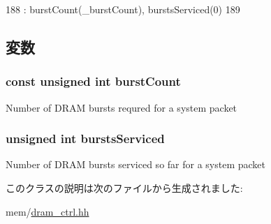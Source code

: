 \begin{DoxyCode}
188             : burstCount(_burstCount), burstsServiced(0)
189             { }
\end{DoxyCode}


\subsection{変数}
\hypertarget{classDRAMCtrl_1_1BurstHelper_af18956b23801b2515632faae1975c9d4}{
\subsubsection[{burstCount}]{\setlength{\rightskip}{0pt plus 5cm}const unsigned int {\bf burstCount}}}
\label{classDRAMCtrl_1_1BurstHelper_af18956b23801b2515632faae1975c9d4}
Number of DRAM bursts requred for a system packet \hypertarget{classDRAMCtrl_1_1BurstHelper_ad168c5fe8d0f76ba798feb77107a06a1}{
\subsubsection[{burstsServiced}]{\setlength{\rightskip}{0pt plus 5cm}unsigned int {\bf burstsServiced}}}
\label{classDRAMCtrl_1_1BurstHelper_ad168c5fe8d0f76ba798feb77107a06a1}
Number of DRAM bursts serviced so far for a system packet 

このクラスの説明は次のファイルから生成されました:\begin{DoxyCompactItemize}
\item 
mem/\hyperlink{dram__ctrl_8hh}{dram\_\-ctrl.hh}\end{DoxyCompactItemize}
